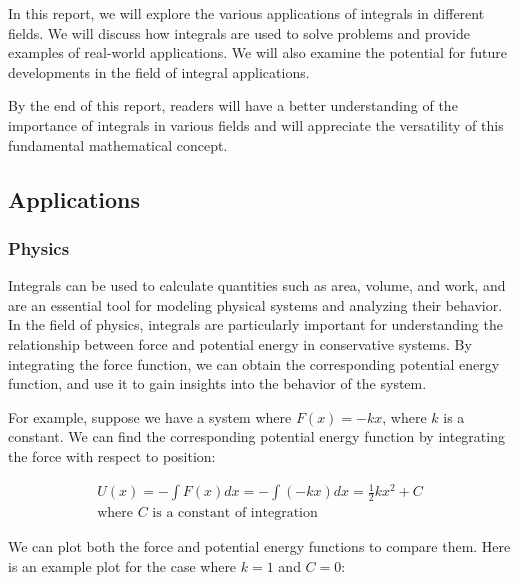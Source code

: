 \documentclass[13pt,a4paper]{report}
\begin{document}
In this report, we will explore the various applications of integrals in different fields. We will discuss how integrals are used to solve problems and provide examples of real-world applications. We will also examine the potential for future developments in the field of integral applications.

By the end of this report, readers will have a better understanding of the importance of integrals in various fields and will appreciate the versatility of this fundamental mathematical concept.

\newpage
\subsection{Applications}
\subsubsection{Physics}
Integrals can be used to calculate quantities such as area, volume, and work, and are an essential tool for modeling physical systems and analyzing their behavior. In the field of physics, integrals are particularly important for understanding the relationship between force and potential energy in conservative systems. By integrating the force function, we can obtain the corresponding potential energy function, and use it to gain insights into the behavior of the system.

For example, suppose we have a system where $F(x) = -kx$, where $k$ is a constant. We can find the corresponding potential energy function by integrating the force with respect to position:

\begin{gather*}
U(x) = -\int F(x) dx = -\int (-kx) dx = \frac{1}{2}kx^2 + C\\
\text{where } C \text{ is a constant of integration}
\end{gather*}

We can plot both the force and potential energy functions to compare them. Here is an example plot for the case where $k=1$ and $C=0$:
\end{document}
